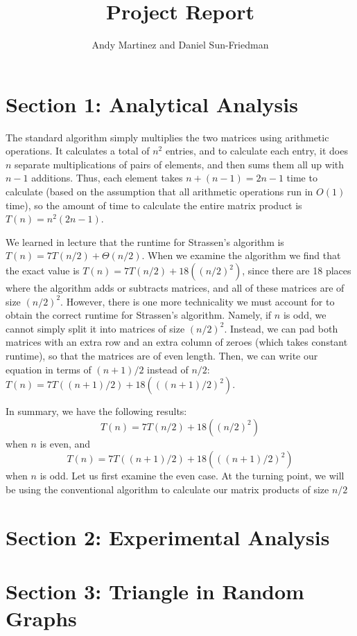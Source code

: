 \documentclass{article}
\title{Project Report}
\author{Andy Martinez and Daniel Sun-Friedman}
\begin{document}
\maketitle

\section{Section 1: Analytical Analysis}

The standard algorithm simply multiplies the two matrices using arithmetic operations. It calculates a total of $n^2$ entries, and to calculate each entry, it does $n$ separate multiplications of pairs of elements, and then sums them all up with $n-1$ additions. Thus, each element takes $n+(n-1)=2n-1$ time to calculate (based on the assumption that all arithmetic operations run in $O(1)$ time), so the amount of time to calculate the entire matrix product is $T(n)=n^2(2n-1)$.

\medskip

We learned in lecture that the runtime for Strassen's algorithm is $T(n)=7T(n/2) + \Theta(n/2)$. When we examine the algorithm we find that the exact value is $T(n)=7T(n/2) + 18((n/2)^2)$, since there are 18 places where the algorithm adds or subtracts matrices, and all of these matrices are of size $(n/2)^2$. However, there is one more technicality we must account for to obtain the correct runtime for Strassen's algorithm. Namely, if $n$ is odd, we cannot simply split it into matrices of size $(n/2)^2$. Instead, we can pad both matrices with an extra row and an extra column of zeroes (which takes constant runtime), so that the matrices are of even length. Then, we can write our equation in terms of $(n+1)/2$ instead of $n/2$: $T(n)=7T((n+1)/2) + 18(((n+1)/2)^2)$.

\medskip

In summary, we have the following results: $$T(n)=7T(n/2) + 18((n/2)^2)$$ when $n$ is even, and $$T(n)=7T((n+1)/2) + 18(((n+1)/2)^2)$$ when $n$ is odd. Let us first examine the even case. At the turning point, we will be using the conventional algorithm to calculate our matrix products of size $n/2$

\section{Section 2: Experimental Analysis}


\section{Section 3: Triangle in Random Graphs}
\end{document}
